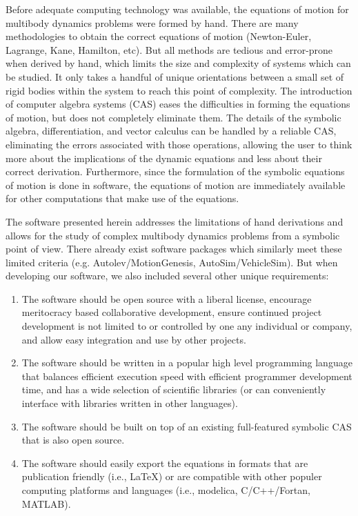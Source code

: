 \documentclass[twocolumn,10pt]{asme2e}
\begin{document}
Before adequate computing technology was available, the equations of motion for
multibody dynamics problems were formed by hand. There are many
methodologies to obtain the correct equations of motion (Newton-Euler,
Lagrange, Kane, Hamilton, etc). But all methods are tedious and error-prone
when derived by hand, which limits the size and complexity of systems which can
be studied. It only takes a handful of unique orientations between a small set
of rigid bodies within the system to reach this point of complexity. The
introduction of computer algebra systems (CAS) eases the difficulties in
forming the equations of motion, but does not completely eliminate them. The
details of the symbolic algebra, differentiation, and vector calculus can be
handled by a reliable CAS, eliminating the errors associated with those
operations, allowing the user to think more about the implications of the
dynamic equations and less about their correct derivation. Furthermore, since
the formulation of the symbolic equations of motion is done in software, the
equations of motion are immediately available for other computations that make
use of the equations.

The software presented herein addresses the limitations of hand derivations and
allows for the study of complex multibody dynamics problems from a symbolic
point of view. There already exist software packages which similarly meet these
limited criteria (e.g. Autolev/MotionGenesis, AutoSim/VehicleSim). But when
developing our software, we also included several other unique requirements:
\begin{enumerate}
  \item The software should be open source with a liberal license, encourage
    meritocracy based collaborative development, ensure continued project
    development is not limited to or controlled by one any individual or
    company, and allow easy integration and use by other projects.

  \item The software should be written in a popular high level programming
  language that balances efficient execution speed with efficient programmer
  development time, and has a wide selection of scientific libraries (or can
  conveniently interface with libraries written in other languages).

  \item The software should be built on top of an existing full-featured
  symbolic CAS that is also open source.

  \item The software should easily export the equations in formats that are
  publication friendly (i.e., \LaTeX) or are compatible with other populer
  computing platforms and languages (i.e., modelica, C/C++/Fortan, MATLAB).
\end{enumerate}
\end{document}
